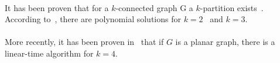 \paragraph{}
It has been proven that for a $k$-connected graph G a $k$-partition
exists~\cite{GE78,LL77}.
According to~\cite{JS94}, there are polynomial solutions for
$k=2$~\cite{GE78,LL77} and $k=3$.

\paragraph{}
More recently, it has been proven in~\cite{Nakano1997315} that if $G$ is a planar graph, there is a linear-time algorithm for $k = 4$.




